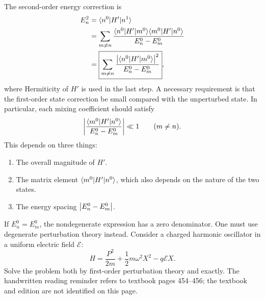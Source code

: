 The second-order energy correction is
\begin{align*}
 E_n^2&=\langle n^0\rvert H'\lvert n^1\rangle\\
 &=\sum_{m\ne n}
 \frac{\langle n^0\rvert H'\lvert m^0\rangle\langle m^0\rvert H'\lvert n^0\rangle}{E_n^0-E_m^0}\\
 &=\boxed{\displaystyle\sum_{m\ne n}
 \frac{\left\lvert\langle n^0\rvert H'\lvert m^0\rangle\right\rvert^2}{E_n^0-E_m^0}},
\end{align*}
where Hermiticity of $H'$ is used in the last step.
A necessary requirement is that the first-order state correction be
small compared with the unperturbed state. In particular, each mixing
coefficient should satisfy
\[
 \left\lvert\frac{\langle m^0\rvert H'\lvert n^0\rangle}{E_n^0-E_m^0}\right\rvert\ll1\qquad(m\ne n).
\]
This depends on three things:
\begin{enumerate}
 \item The overall magnitude of $H'$.
 \item The matrix element $\langle m^0\rvert H'\lvert n^0\rangle$, which also depends on
       the nature of the two states.
 \item The energy spacing $\left\lvert E_n^0-E_m^0\right\rvert$.
\end{enumerate}
If $E_n^0=E_m^0$, the nondegenerate expression has a zero denominator.
One must use degenerate perturbation theory instead.
Consider a charged harmonic oscillator in a uniform electric field
$\mathcal E$:
\[
 H=\frac{P^2}{2m}+\frac12m\omega^2X^2-q\mathcal E X.
\]
Solve the problem both by first-order perturbation theory and exactly.
The handwritten reading reminder refers to textbook pages 454--456;
the textbook and edition are not identified on this page.
